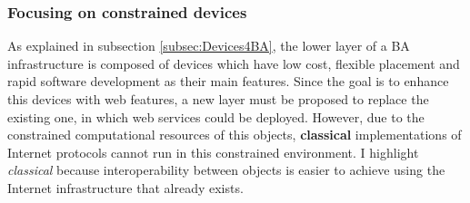 




\subsubsection{Focusing on constrained devices}
\label{subsec:constrainedObj}
As explained in subsection \ref{subsec:Devices4BA}, the lower layer of a BA infrastructure is composed of devices which have low cost, flexible placement and rapid software development as their main features.
Since the goal is to enhance this devices with web features, a new layer must be proposed to replace the existing one, in which web services could be deployed.
However, due to the constrained computational resources of this objects, \textbf{classical} implementations of Internet protocols cannot run in this constrained environment.
I highlight \textit{classical} because interoperability between objects is easier to achieve using the Internet infrastructure that already exists.

